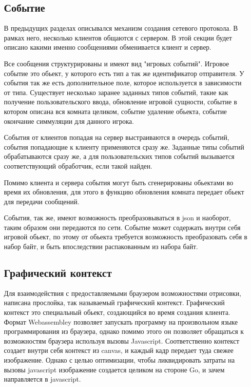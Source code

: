 \documentclass[a4paper,14pt, openany]{book}
\begin{document}
\subsection{Событие}

В предыдущих разделах описывался механизм создания сетевого протокола. В рамках него, несколько клиентов общаются с сервером. В этой секции будет описано какими именно сообщениями обменивается клиент и сервер.

Все сообщения структурированы и имеют вид "игровых событий". Игровое событие это обьект, у которого есть тип а так же идентификатор отправителя. У события так же есть дополнительное поле, которое используется в зависимости от типа. Существует несколько заранее заданных типов событий, такие как получение пользовательского ввода, обновление игровой сущности, событие в котором описана вся комната целиком, событие удаление обьекта, событие окончание симмуляции для данного игрока.

События от клиентов попадая на сервер выстраиваются в очередь событий, события попадающие к клиенту применяются сразу же. Заданные типы событий обрабатываются сразу же, а для пользовательских типов событий вызывается соответствующий обработчик, если такой найден. 

Помимо клиента и сервера события могут быть сгенерированы обьектами во время их обновления, для этого в функцию обновления комната передает обьект для передачи сообщений.

События, так же, имеют возможность преобразовываться в json и наоборот, таким образом они передаются по сети. Событие может содержать внутри себя игровой обьект, по этому от обьекта требуется возможность преобразовать себя в набор байт, и быть впоследствии распакованным из набора байт.

\subsection{Графический контекст}

Для взаимодействия с предоставляемыми браузером возможностями отрисовки, написана прослойка, так называемый графический контекст. Графический контекст это специальный обьект, создающийся во время создания клиента. Формат Webassembley позволяет запускать программу на произвольном языке программирования из браузера, однако помимо этого он позволяет обращаться к возможностям браузера используя вызовы Javascript. Соответственно контекст создает внутри себя контекст из canvas, и каждый кадр передает туда свежее изображение. Однако с целью оптимизации, чтобы ликвидировать затраты на вызовы javascript изображение создается целиком на стороне Go, и зачем направляется в javascript. 
\end{document}
